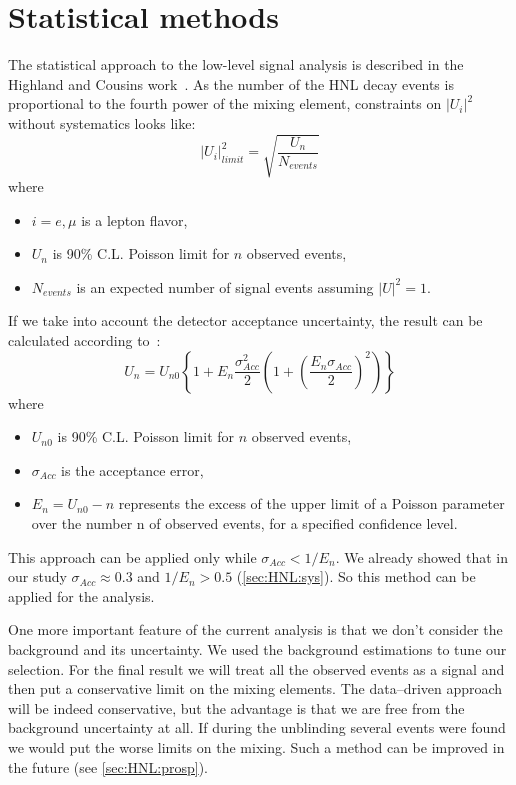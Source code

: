 \documentclass[../main.tex]{subfiles}
\begin{document}
\section{Statistical methods}
\label{sec:HNL:stat}
The statistical approach to the low-level signal analysis is described in the Highland and Cousins work~\cite{Cousins1992}. As the number of the HNL decay events is proportional to the fourth power of the mixing element, constraints on $\left|U_i\right|^2$ without systematics looks like:
\begin{equation}
  \left|U_i\right|^2_{limit}=\sqrt{\frac{U_n}{N_{events}}}
  \label{eq:HNL:constraints}
\end{equation}
where
\begin{itemize}
    \item $i=e,\mu$ is a lepton flavor,
    \item $U_n$ is 90\% C.L. Poisson limit for $n$ observed events,
    \item $N_{events}$ is an expected number of signal events assuming $\left|U\right|^2=1$.
\end{itemize}
If we take into account the detector acceptance uncertainty, the result can be calculated according to~\cite{Cousins1992}:
\begin{equation}
  U_n=U_{n0}\left\{1+E_n\frac{\sigma^2_{Acc}}{2}\left(1+\left(\frac{E_n\sigma_{Acc}}{2}\right)^2\right)\right\}
  \label{eq:HNL:constrainsAcc}
\end{equation}
where
\begin{itemize}
    \item $U_{n0}$ is 90\% C.L. Poisson limit for $n$ observed events,
    \item $\sigma_{Acc}$ is the acceptance error,
    \item $E_n=U_{n0}-n$ represents the excess of the upper limit of a Poisson parameter over the number n of observed events, for a specified confidence level.
\end{itemize}
This approach can be applied only while $\sigma_{Acc}<1/E_n$. We already showed that in our study $\sigma_{Acc}\approx0.3$ and $1/E_n>0.5$ (\autoref{sec:HNL:sys}). So this method can be applied for the analysis.

One more important feature of the current analysis is that we don't consider the background and its uncertainty. We used the background estimations to tune our selection. For the final result we will treat all the observed events as a signal and then put a conservative limit on the mixing elements. The data--driven approach will be indeed conservative, but the advantage is that we are free from the background uncertainty at all. If during the unblinding several events were found we would put the worse limits on the mixing. Such a method can be improved in the future (see \autoref{sec:HNL:prosp}).
\end{document}
